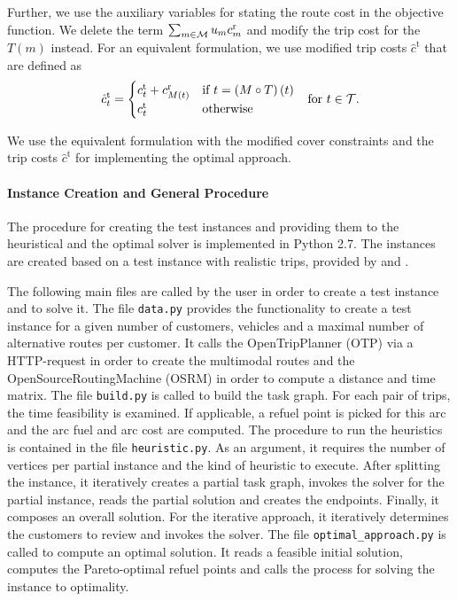 Further, we use the auxiliary variables for stating the route cost in the objective function. We delete the term $\sum_{m\in\mathcal{M}} u_mc^{\operatorname{r}}_m$ and modify the trip cost for the $T(m)$ instead. For an equivalent formulation, we use modified trip costs $\hat{c}^{\operatorname{t}}$ that are defined as
\begin{align*}
	\hat{c}^{\operatorname{t}}_t = \begin{cases} c^{\operatorname{t}}_t + c^{\operatorname{r}}_{M(t)} & \text{if } t = \left(M\circ T\right)(t) \\ c^{\operatorname{t}}_t & \text{otherwise} \end{cases} && \text{for } t\in\mathcal{T}.
\end{align*}

We use the equivalent formulation with the modified cover constraints and the trip costs $\hat{c}^{\operatorname{t}}$ for implementing the optimal approach.

\paragraph{Instance Creation and General Procedure} \parfill

The procedure for creating the test instances and providing them to the heuristical and the optimal solver is implemented in Python 2.7. The instances are created based on a test instance with realistic trips, provided by \cite{Kaiser} and \cite{Knoll}.

The following main files are called by the user in order to create a test instance and to solve it. The file \texttt{data.py} provides the functionality to create a test instance for a given number of customers, vehicles and a maximal number of alternative routes per customer. It calls the OpenTripPlanner (OTP) via a HTTP-request in order to create the multimodal routes and the OpenSourceRoutingMachine (OSRM) in order to compute a distance and time matrix. The file \texttt{build.py} is called to build the task graph. For each pair of trips, the time feasibility is examined. If applicable, a refuel point is picked for this arc and the arc fuel and arc cost are computed. The procedure to run the heuristics is contained in the file \texttt{heuristic.py}. As an argument, it requires the number of vertices per partial instance and the kind of heuristic to execute. After splitting the instance, it iteratively creates a partial task graph, invokes the solver for the partial instance, reads the partial solution and creates the endpoints. Finally, it composes an overall solution. For the iterative approach, it iteratively determines the customers to review and invokes the solver. The file \texttt{optimal\_approach.py} is called to compute an optimal solution. It reads a feasible initial solution, computes the Pareto-optimal refuel points and calls the process for solving the instance to optimality.


